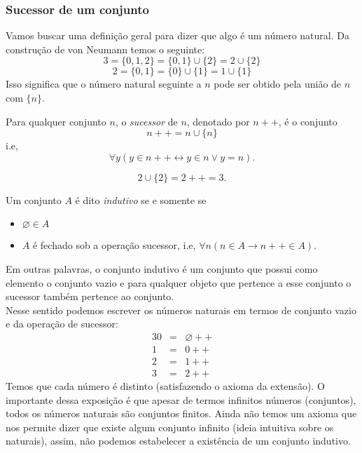       \subsubsection{Sucessor de um conjunto}
         Vamos buscar uma definição geral para dizer que algo é um número natural.
         Da construção de von Neumann temos o seguinte:
         $$3 = \{0,1,2\} = \{0,1\} \cup \{2\} = 2 \cup \{2\}$$
         $$2 = \{0,1\} = \{0\} \cup \{1\} = 1 \cup \{1\}$$
         Isso significa que o número natural seguinte a $n$ pode ser obtido pela união 
         de $n$ com $\{n\}$.
         \begin{definition}
            Para qualquer conjunto $n$, o \emph{sucessor} de $n$, 
            denotado por $n++$, é o conjunto $$n++ = n \cup \{n\}$$
            i.e, $$\forall y(y \in n++ \leftrightarrow y \in n \lor y = n).$$
         \end{definition}
         \begin{exmp}
            $$2 \cup \{2\} = 2++ = 3.$$
         \end{exmp}
         \begin{definition}
            Um conjunto $A$ é dito \emph{indutivo} se e somente se
            \begin{itemize}
               \item $\varnothing \in A$
               \item $A$ é fechado sob a operação sucessor, i.e, 
                  $\forall n (n \in A \rightarrow n++ \in A).$
            \end{itemize}
         \end{definition}
         Em outras palavras, o conjunto indutivo é um conjunto que possui como elemento o 
         conjunto vazio e para qualquer objeto que pertence a esse conjunto o sucessor também 
         pertence ao conjunto.\\
         Nesse sentido podemos escrever os números naturais em termos de conjunto vazio e 
         da operação de sucessor:
         \begin{alignat}{3}
            \nonumber 0 &=& \varnothing ++\\
            \nonumber 1 &=& 0++\\
            \nonumber 2 &=& 1++\\
            \nonumber 3 &=& 2++
         \end{alignat}
         Temos que cada número é distinto (satisfazendo o axioma da extensão). 
         O importante dessa exposição é que apesar de termos infinitos números (conjuntos), 
         todos os números naturais são conjuntos finitos. Ainda não temos um axioma que nos 
         permite dizer que existe algum conjunto infinito (ideia intuitiva sobre os naturais), 
         assim, não podemos estabelecer a existência de um conjunto indutivo.
